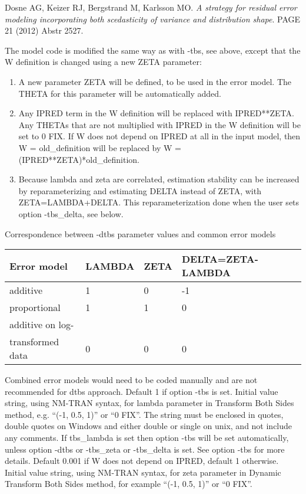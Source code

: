 \begin{optionlist}
Dosne AG, Keizer RJ, Bergstrand M, Karlsson MO. \emph{A strategy for residual error modeling incorporating both scedasticity of variance and distribution shape}. 
PAGE 21 (2012) Abstr 2527.

The model code is modified the same way as with -tbs, see above, except that the W definition is changed using a new ZETA parameter:
\begin{enumerate}
\item A new parameter ZETA will be defined, to be used in the error model. The THETA for this parameter will be automatically added.
\item Any IPRED term in the W definition will be replaced with IPRED**ZETA.
Any THETAs that are not multiplied with IPRED in the W definition will be set to 0 FIX.
If W does not depend on IPRED at all in the input model, then W = old\_definition will be replaced by
W = (IPRED**ZETA)*old\_definition.
\item Because lambda and zeta are correlated, estimation stability can be increased 
by reparameterizing and estimating DELTA instead of ZETA, with ZETA=LAMBDA+DELTA. 
This reparameterization done when the user sets option -tbs\_delta, see below.
\end{enumerate}
Correspondence between -dtbs parameter values and common error models\\
\begin{tabular}{|l|l|l|l|}
\hline
Error model & LAMBDA & ZETA & DELTA=ZETA-LAMBDA\\
\hline
additive & 1 & 0 & -1 \\
\hline
proportional & 1 & 1 & 0 \\
\hline
additive on log-&  &  &  \\
transformed data & 0 & 0 & 0 \\
\hline
\end{tabular}
Combined error models would need to be coded manually and are not recommended for dtbs approach.
\nextopt
{}
Default 1 if option -tbs is set. Initial value string, using NM-TRAN syntax, for lambda parameter in Transform Both Sides method, e.g. ``(-1, 0.5, 1)'' or 
``0 FIX''. The string must be enclosed in quotes, double quotes on Windows and either double or single on unix, and not include any comments. If tbs\_lambda is set then option -tbs will be set automatically, unless option -dtbs or -tbs\_zeta or -tbs\_delta is set. 
See option -tbs for more details. 
\nextopt
{}
Default 0.001 if W does not depend on IPRED, default 1 otherwise. Initial value string, using NM-TRAN syntax, for zeta parameter in Dynamic Transform Both Sides method, for example ``(-1, 0.5, 1)'' or ``0 FIX''.

\end{optionlist}
